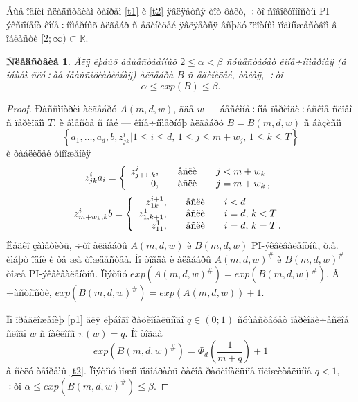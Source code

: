 \documentclass{article}
\numberwithin{equation}{section}
\theoremstyle{plain}
\newtheorem{corollary}{Ñëåäñòâèå}
\theoremstyle{definition}
\newtheorem{proof}{Äîêàçàòåëüñòâî}
\begin{document}
\begin{fulltext}
Åùå îäíèì ñëåäñòâèåì òåîðåì \ref{t1} è \ref{t2} ÿâëÿåòñÿ òîò ôàêò, ÷òî ñîâîêóïíîñòü 
PI-ýêñïîíåíò êîíå÷íîìåðíûõ àëãåáð ñ åäèíèöåé ÿâëÿåòñÿ âñþäó ïëîòíûì ïîäìíîæåñòâîì â îáëàñòè
 $[2;\infty)\subset \mathbb{R}$.
 
\begin{corollary}\label{c2}
Äëÿ ëþáûõ âåùåñòâåííûõ $2\le\alpha <\beta$ ñóùåñòâóåò êîíå÷íîìåðíàÿ
(â îáùåì ñëó÷àå íåàññîöèàòèâíàÿ)  àëãåáðà $B$ ñ åäèíèöåé, òàêàÿ, ÷òî
$$
\alpha \le exp(B) \le \beta.
$$
\end{corollary}

\begin{proof}
Ðàññìîòðèì àëãåáðó $A(m,d,w)$, ãäå $w$ --- áåñêîíå÷íîå ïåðèîäè÷åñêîå ñëîâî ñ ïåðèîäîì $T$,
è âìåñòå ñ íåé --- êîíå÷íîìåðíóþ àëãåáðó $B=B(m,d,w)$  ñ áàçèñîì
$$
\left\lbrace a_1,\ldots,a_d,b, z^i_{jk}\vert
1\le i \le d,\,  1\le j \le m+w_j,\, 1\le k \le T \right\rbrace
$$
è òàáëèöåé óìíîæåíèÿ
$$
z^i_{jk} a_i=
\left\{
  \begin{array}{rcl}
     z^i_{j+1,k}, &\quad \hbox{åñëè} \quad & j<m+w_k  \\
    0, &\quad \hbox{åñëè} \quad & j=m+w_k\, ,
           \end{array}
\right.
$$ 
$$
z^i_{m+w_k,k} b=
\left\{
  \begin{array}{rcl}
     z^{i+1}_{1k}, &\quad \hbox{åñëè} \quad & i<d  \\
    z_{1,k+1}^1, &\quad \hbox{åñëè} \quad & i=d,\, k<T \\
    z_{11}^1, &\quad \hbox{åñëè} \quad & i=d,\, k=T\, .
           \end{array}
\right.
$$ 
Ëåãêî çàìåòèòü, ÷òî àëãåáðû $A(m,d,w)$ è $B(m,d,w)$ PI-ýêâèâàëåíòíû, ò.å. èìåþò îäíè è òå 
æå òîæäåñòâà. Íî òîãäà è àëãåáðû $A(m,d,w)^\#$ è $B(m,d,w)^\#$ òîæå PI-ýêâèâàëåíòíû. Ïîýòîìó
$exp(A(m,d,w)^\#)=exp(B(m,d,w)^\#)$. Â ÷àñòíîñòè, $exp(B(m,d,w)^\#) = exp(A(m,d,w))+1$.

Ïî ïðåäëîæåíèþ \ref{p1} äëÿ ëþáîãî ðàöèîíàëüíîãî $q\in(0;1)$ ñóùåñòâóåò ïåðèîäè÷åñêîå ñëîâî 
$w$ ñ íàêëîíîì $\pi(w)=q$. Íî òîãäà
$$
exp(B(m,d,w)^\#)=\Phi_d(\frac{1}{m+q})+1
$$
â ñèëó òåîðåìû \ref{t2}. Ïîýòîìó ìîæíî ïîäîáðàòü òàêîå ðàöèîíàëüíîå ïîëîæèòåëüíîå $q < 1$,
÷òî $\alpha \le exp(B(m,d,w)^\#) \le \beta$.

\end{proof}

\end{fulltext}
\end{document}
